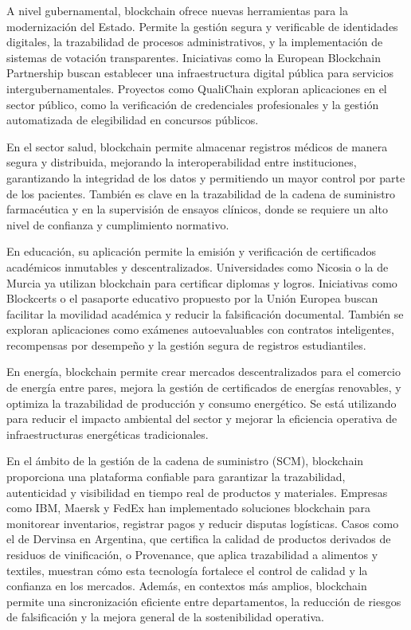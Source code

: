 A nivel gubernamental, blockchain ofrece nuevas herramientas para la modernización del Estado. Permite la gestión segura y verificable de identidades digitales, la trazabilidad de procesos administrativos, y la implementación de sistemas de votación transparentes. Iniciativas como la European Blockchain Partnership buscan establecer una infraestructura digital pública para servicios intergubernamentales. Proyectos como QualiChain exploran aplicaciones en el sector público, como la verificación de credenciales profesionales y la gestión automatizada de elegibilidad en concursos públicos.

En el sector salud, blockchain permite almacenar registros médicos de manera segura y distribuida, mejorando la interoperabilidad entre instituciones, garantizando la integridad de los datos y permitiendo un mayor control por parte de los pacientes. También es clave en la trazabilidad de la cadena de suministro farmacéutica y en la supervisión de ensayos clínicos, donde se requiere un alto nivel de confianza y cumplimiento normativo.

En educación, su aplicación permite la emisión y verificación de certificados académicos inmutables y descentralizados. Universidades como Nicosia o la de Murcia ya utilizan blockchain para certificar diplomas y logros. Iniciativas como Blockcerts o el pasaporte educativo propuesto por la Unión Europea buscan facilitar la movilidad académica y reducir la falsificación documental. También se exploran aplicaciones como exámenes autoevaluables con contratos inteligentes, recompensas por desempeño y la gestión segura de registros estudiantiles.

En energía, blockchain permite crear mercados descentralizados para el comercio de energía entre pares, mejora la gestión de certificados de energías renovables, y optimiza la trazabilidad de producción y consumo energético. Se está utilizando para reducir el impacto ambiental del sector y mejorar la eficiencia operativa de infraestructuras energéticas tradicionales.

En el ámbito de la gestión de la cadena de suministro (SCM), blockchain proporciona una plataforma confiable para garantizar la trazabilidad, autenticidad y visibilidad en tiempo real de productos y materiales. Empresas como IBM, Maersk y FedEx han implementado soluciones blockchain para monitorear inventarios, registrar pagos y reducir disputas logísticas. Casos como el de Dervinsa en Argentina, que certifica la calidad de productos derivados de residuos de vinificación, o Provenance, que aplica trazabilidad a alimentos y textiles, muestran cómo esta tecnología fortalece el control de calidad y la confianza en los mercados. Además, en contextos más amplios, blockchain permite una sincronización eficiente entre departamentos, la reducción de riesgos de falsificación y la mejora general de la sostenibilidad operativa.

